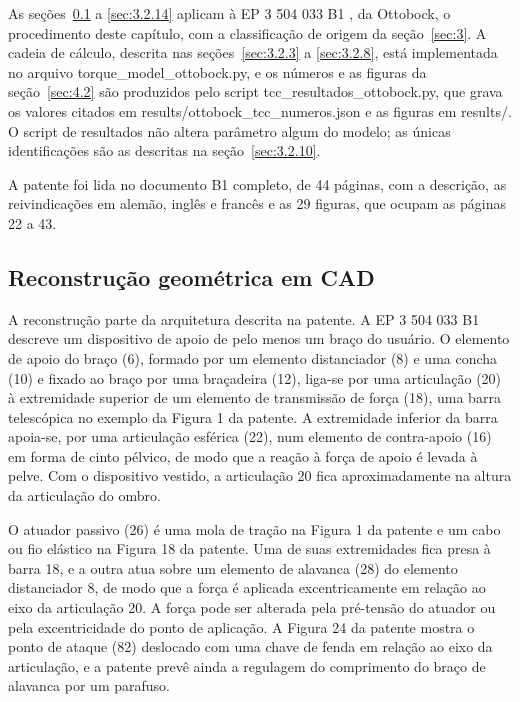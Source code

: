 As seções~\ref{sec:3.2.1} a \ref{sec:3.2.14} aplicam à EP 3 504 033 B1 \cite{mizera2023}, da Ottobock, o procedimento deste capítulo, com a classificação de origem da seção~\ref{sec:3}. A cadeia de cálculo, descrita nas seções~\ref{sec:3.2.3} a \ref{sec:3.2.8}, está implementada no arquivo torque\_model\_ottobock.py, e os números e as figuras da seção~\ref{sec:4.2} são produzidos pelo script tcc\_resultados\_ottobock.py, que grava os valores citados em results/ottobock\_tcc\_numeros.json e as figuras em results/. O script de resultados não altera parâmetro algum do modelo; as únicas identificações são as descritas na seção~\ref{sec:3.2.10}.

A patente foi lida no documento B1 completo, de 44 páginas, com a descrição, as reivindicações em alemão, inglês e francês e as 29 figuras, que ocupam as páginas 22 a 43.

\subsection{Reconstrução geométrica em CAD}\label{sec:3.2.1}

A reconstrução parte da arquitetura descrita na patente. A EP 3 504 033 B1 descreve um dispositivo de apoio de pelo menos um braço do usuário. O elemento de apoio do braço (6), formado por um elemento distanciador (8) e uma concha (10) e fixado ao braço por uma braçadeira (12), liga-se por uma articulação (20) à extremidade superior de um elemento de transmissão de força (18), uma barra telescópica no exemplo da Figura 1 da patente. A extremidade inferior da barra apoia-se, por uma articulação esférica (22), num elemento de contra-apoio (16) em forma de cinto pélvico, de modo que a reação à força de apoio é levada à pelve. Com o dispositivo vestido, a articulação 20 fica aproximadamente na altura da articulação do ombro.

O atuador passivo (26) é uma mola de tração na Figura 1 da patente e um cabo ou fio elástico na Figura 18 da patente. Uma de suas extremidades fica presa à barra 18, e a outra atua sobre um elemento de alavanca (28) do elemento distanciador 8, de modo que a força é aplicada excentricamente em relação ao eixo da articulação 20. A força pode ser alterada pela pré-tensão do atuador ou pela excentricidade do ponto de aplicação. A Figura 24 da patente mostra o ponto de ataque (82) deslocado com uma chave de fenda em relação ao eixo da articulação, e a patente prevê ainda a regulagem do comprimento do braço de alavanca por um parafuso.

